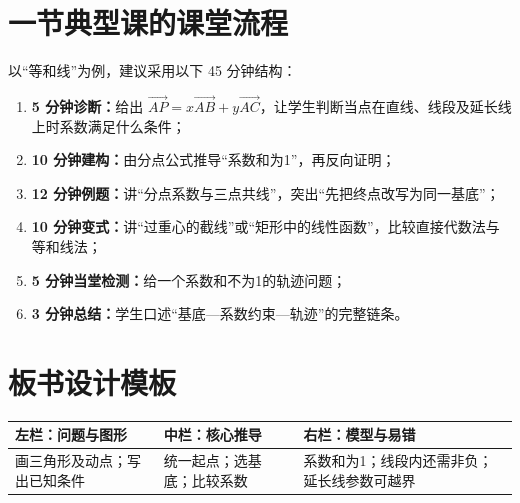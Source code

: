 \documentclass[11pt,a4paper,openany]{ctexbook}
\newcommand{\vect}[1]{\overrightarrow{#1}}
\begin{document}
\section{一节典型课的课堂流程}
以“等和线”为例，建议采用以下 45 分钟结构：
\begin{enumerate}
  \item \textbf{5 分钟诊断：}给出
  \(
  \vect{AP}=x\vect{AB}+y\vect{AC}
  \)，让学生判断当点在直线、线段及延长线上时系数满足什么条件；
  \item \textbf{10 分钟建构：}由分点公式推导“系数和为1”，再反向证明；
  \item \textbf{12 分钟例题：}讲“分点系数与三点共线”，突出“先把终点改写为同一基底”；
  \item \textbf{10 分钟变式：}讲“过重心的截线”或“矩形中的线性函数”，比较直接代数法与等和线法；
  \item \textbf{5 分钟当堂检测：}给一个系数和不为1的轨迹问题；
  \item \textbf{3 分钟总结：}学生口述“基底—系数约束—轨迹”的完整链条。
\end{enumerate}

\section{板书设计模板}
\begin{center}
\begin{tabularx}{0.96\textwidth}{|X|X|X|}
\hline
\textbf{左栏：问题与图形} & \textbf{中栏：核心推导} & \textbf{右栏：模型与易错}\\
\hline
画三角形及动点；写出已知条件 & 统一起点；选基底；比较系数 & 系数和为1；线段内还需非负；延长线参数可越界\\
\hline
\end{tabularx}
\end{center}
\end{document}
